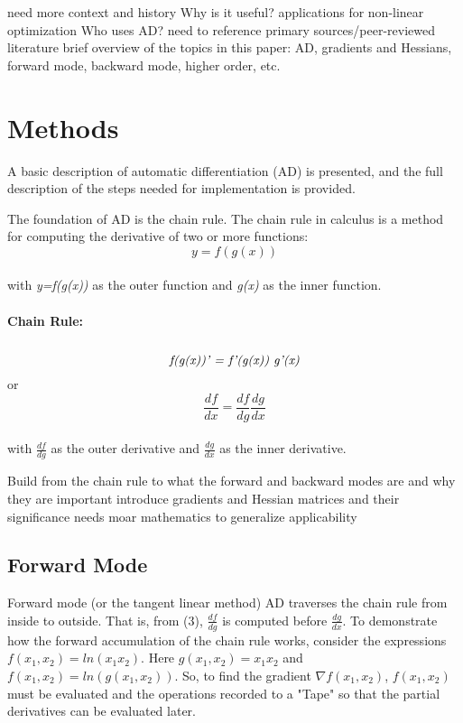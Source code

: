 \documentclass[oneside]{article}
\begin{document}
\begin{editnote}
need more context and history
Why is it useful?
applications for non-linear optimization
Who uses AD?
need to reference primary sources/peer-reviewed literature
brief overview of the topics in this paper:  AD, gradients and Hessians, forward mode, backward mode, higher order, etc.
\end{editnote}

\section{Methods}

A basic description of automatic differentiation (AD) is presented, and the full description of the steps needed for implementation is provided.

The foundation of AD is the chain rule. The chain rule in calculus is a method for computing the derivative of two or more functions:\\
 \begin{equation}
 y = f(g(x))
 \end{equation}
  \\
 with \textit{y=f(g(x))} as the outer function and \textit{g(x)} as the inner function. \\
 \\
 \textbf{Chain Rule:} \\ \\
  \begin{equation}
 \textit{f(g(x))' = f'(g(x)) g'(x)} \\
 \end{equation}
 or \\
\begin{equation}
\frac{df}{dx} = \frac{df}{dg}\frac{dg}{dx}
\end{equation}
\\
with \textit{$\frac{df}{dg}$} as the outer derivative and \textit{$\frac{dg}{dx}$} as the inner derivative. \\

\begin{editnote}
Build from the chain rule to what the forward and backward modes are and why they are important
introduce gradients and Hessian matrices and their significance
needs moar mathematics to generalize applicability
\end{editnote}

\subsection{Forward Mode}
Forward mode (or the tangent linear method) AD traverses the chain rule from inside to outside. That is, from (3),  \textit{$\frac{df}{dg}$} is computed before \textit{$\frac{dg}{dx}$}. To demonstrate how the forward accumulation of the chain rule works, consider the expressions $f(x_1,x_2) = ln(x_1x_2)$. Here $g(x_1,x_2) = x_1x_2$ and $f(x_1,x_2) = ln(g(x_1,x_2))$. So, to find the gradient $\nabla f(x_1,x_2)$, $f(x_1,x_2)$ must be evaluated and the operations recorded to a "Tape" so that the partial derivatives can be evaluated later.\\
\end{document}
